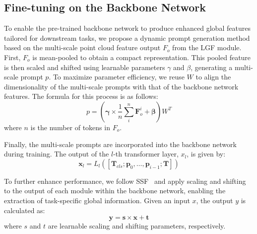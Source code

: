 \subsection{Fine-tuning on the Backbone Network}
\label{sec:FT_backbone}
To enable the pre-trained backbone network to produce enhanced global features tailored for downstream tasks, we propose a dynamic prompt generation method based on the multi-scale point cloud feature output $F_{o}$ from the LGF module. First, $F_{o}$ is mean-pooled to obtain a compact representation. This pooled feature is then scaled and shifted using learnable parameters $\gamma$ and $\beta$, generating a multi-scale prompt $p$. To maximize parameter efficiency, we reuse $W$ to align the dimensionality of the multi-scale prompts with that of the backbone network features. The formula for this process is as follows:
\begin{equation}
	p = \left( \boldsymbol{\gamma} \times \frac{1}{n}\sum_i^n{\boldsymbol{F}_{o}^i} + \boldsymbol{\beta} \right) W^T
\end{equation}
where $n$ is the number of tokens in $F_o$.

Finally, the multi-scale prompts are incorporated into the backbone network during training. The output of the $l$-th transformer layer, $x_l$, is given by:
\begin{equation}
	\boldsymbol{x}_l = L_l\left(\left[\boldsymbol{T}_{cls} ; \boldsymbol{p}_{0}, \ldots, \boldsymbol{p}_{i-1} ; \boldsymbol{T}\right]\right)
\end{equation}

To further enhance performance, we follow SSF~\cite{lian2022scaling} and apply scaling and shifting to the output of each module within the backbone network, enabling the extraction of task-specific global information. Given an input $x$, the output $y$ is calculated as:
\begin{equation}
	\boldsymbol{y} = \boldsymbol{s} \times \boldsymbol{x} + \boldsymbol{t}
\end{equation}
where $s$ and $t$ are learnable scaling and shifting parameters, respectively.


